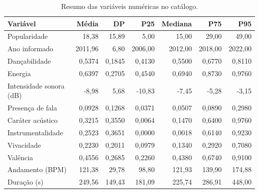\begin{table}[H]\centering\footnotesize
\caption{Resumo das variáveis numéricas no catálogo.}\label{tab:numericos}
\setlength{\tabcolsep}{4.0pt}
\begin{tabular}{@{}lrrrrrr@{}}\toprule
Variável & Média & DP & P25 & Mediana & P75 & P95 \\\midrule
Popularidade & 18,38 & 15,89 & 5,00 & 15,00 & 29,00 & 49,00 \\
Ano informado & 2011,96 & 6,80 & 2006,00 & 2012,00 & 2018,00 & 2022,00 \\
Dançabilidade & 0,5374 & 0,1845 & 0,4130 & 0,5500 & 0,6770 & 0,8110 \\
Energia & 0,6397 & 0,2705 & 0,4540 & 0,6940 & 0,8730 & 0,9760 \\
Intensidade sonora (dB) & -8,98 & 5,68 & -10,83 & -7,45 & -5,28 & -3,15 \\
Presença de fala & 0,0928 & 0,1268 & 0,0371 & 0,0507 & 0,0890 & 0,2980 \\
Caráter acústico & 0,3215 & 0,3550 & 0,0064 & 0,1470 & 0,6400 & 0,9760 \\
Instrumentalidade & 0,2523 & 0,3651 & 0,0000 & 0,0018 & 0,6140 & 0,9230 \\
Vivacidade & 0,2230 & 0,2011 & 0,0979 & 0,1340 & 0,2920 & 0,7080 \\
Valência & 0,4556 & 0,2685 & 0,2260 & 0,4380 & 0,6740 & 0,9100 \\
Andamento (BPM) & 121,38 & 29,78 & 98,80 & 121,93 & 139,90 & 174,88 \\
Duração (s) & 249,56 & 149,43 & 181,09 & 225,74 & 286,91 & 448,00 \\
\bottomrule
\end{tabular}
\end{table}
